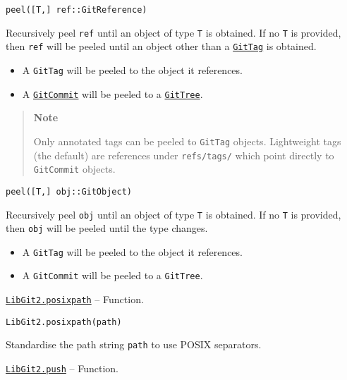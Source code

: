 \begin{adjustwidth}{2em}{0pt}


\begin{verbatim}
peel([T,] ref::GitReference)
\end{verbatim}

Recursively peel \texttt{ref} until an object of type \texttt{T} is obtained. If no \texttt{T} is provided, then \texttt{ref} will be peeled until an object other than a \hyperlink{10467695058580020738}{\texttt{GitTag}} is obtained.

\begin{itemize}
\item A \texttt{GitTag} will be peeled to the object it references.


\item A \hyperlink{5346527129202716606}{\texttt{GitCommit}} will be peeled to a \hyperlink{6242150303858692069}{\texttt{GitTree}}.

\end{itemize}
\begin{quote}
\textbf{Note}

Only annotated tags can be peeled to \texttt{GitTag} objects. Lightweight tags (the default) are references under \texttt{refs/tags/} which point directly to \texttt{GitCommit} objects.

\end{quote}



\begin{lstlisting}
peel([T,] obj::GitObject)
\end{lstlisting}

Recursively peel \texttt{obj} until an object of type \texttt{T} is obtained. If no \texttt{T} is provided, then \texttt{obj} will be peeled until the type changes.

\begin{itemize}
\item A \texttt{GitTag} will be peeled to the object it references.


\item A \texttt{GitCommit} will be peeled to a \texttt{GitTree}.

\end{itemize}


\end{adjustwidth}
\hypertarget{8201535180875495206}{} 
\hyperlink{8201535180875495206}{\texttt{LibGit2.posixpath}}  -- {Function.}

\begin{adjustwidth}{2em}{0pt}


\begin{verbatim}
LibGit2.posixpath(path)
\end{verbatim}

Standardise the path string \texttt{path} to use POSIX separators.



\end{adjustwidth}
\hypertarget{9401118176170322302}{} 
\hyperlink{9401118176170322302}{\texttt{LibGit2.push}}  -- {Function.}


